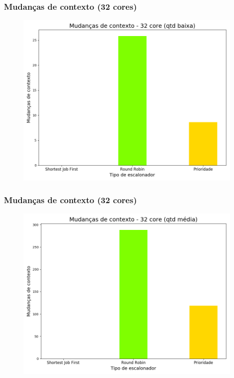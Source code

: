 \documentclass{beamer}
\begin{document}
\begin{frame}
\frametitle{Mudanças de contexto (32 cores)}
\begin{figure}
\includegraphics[scale=0.4]{ctx_small_32.png}
\end{figure}
\end{frame}

\begin{frame}
\frametitle{Mudanças de contexto (32 cores)}
\begin{figure}
\includegraphics[scale=0.4]{ctx_med_32.png}
\end{figure}
\end{frame}
\end{document}
